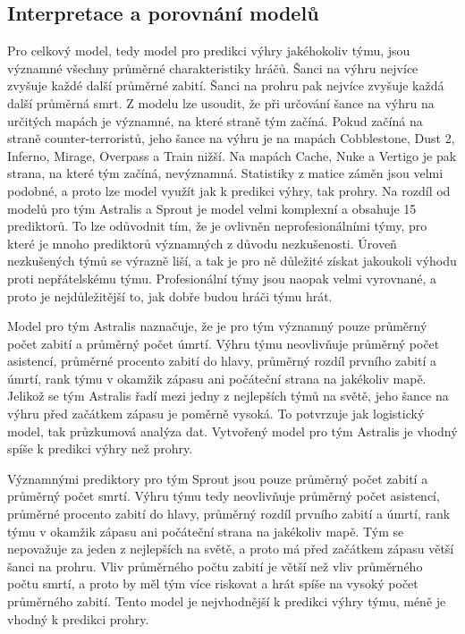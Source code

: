 \subsection{Interpretace a porovnání modelů}
Pro celkový model, tedy model pro predikci výhry jakéhokoliv týmu, jsou významné všechny průměrné charakteristiky hráčů. Šanci na výhru nejvíce zvyšuje každé
další průměrné zabití. Šanci na prohru pak nejvíce zvyšuje každá další průměrná smrt. Z modelu lze usoudit, že při určování šance na výhru na určitých mapách je významné, na které 
straně tým začíná. Pokud začíná na straně counter-terroristů, jeho šance na výhru je na mapách Cobblestone, Dust 2,
Inferno, Mirage, Overpass a Train nižší. Na mapách Cache, Nuke a Vertigo je pak strana, na které tým začíná, nevýznamná. Statistiky z matice záměn jsou velmi podobné, a proto
lze model využít jak k predikci výhry, tak prohry. Na rozdíl od modelů pro tým Astralis a Sprout je model velmi komplexní a obsahuje 15 prediktorů. To lze odůvodnit tím, že je 
ovlivněn neprofesionálními týmy, pro které je mnoho prediktorů významných z důvodu nezkušenosti. Úroveň nezkušených týmů se výrazně liší, a tak je pro ně důležité získat
jakoukoli výhodu proti nepřátelskému týmu. Profesionální týmy jsou naopak velmi vyrovnané, a proto je nejdůležitější to, jak dobře budou hráči týmu hrát. 

Model pro tým Astralis naznačuje, že je pro tým významný pouze průměrný počet zabití a průměrný počet úmrtí. Výhru týmu neovlivňuje průměrný počet asistencí, průměrné
procento zabití do hlavy, průměrný rozdíl prvního zabití a úmrtí, rank týmu v okamžik zápasu ani počáteční strana na jakékoliv mapě. Jelikož se tým Astralis řadí mezi jedny z 
nejlepších týmů na  světě, jeho šance na výhru před začátkem zápasu je poměrně vysoká. To potvrzuje jak logistický model, tak průzkumová analýza dat. Vytvořený model pro tým
Astralis je vhodný spíše k predikci výhry než prohry. 

Významnými prediktory pro tým Sprout jsou pouze průměrný počet zabití a průměrný počet smrtí. Výhru týmu tedy neovlivňuje průměrný počet asistencí, průměrné
procento zabití do hlavy, průměrný rozdíl prvního zabití a úmrtí, rank týmu v okamžik zápasu ani počáteční strana na jakékoliv mapě. Tým se nepovažuje za jeden z
nejlepších na světě, a proto má před začátkem zápasu větší šanci na prohru. Vliv průměrného počtu zabití je větší než vliv průměrného počtu smrtí, a proto by měl tým více
riskovat a hrát spíše na vysoký počet průměrného zabití. Tento model je nejvhodnější k predikci výhry týmu, méně je vhodný k predikci prohry.

